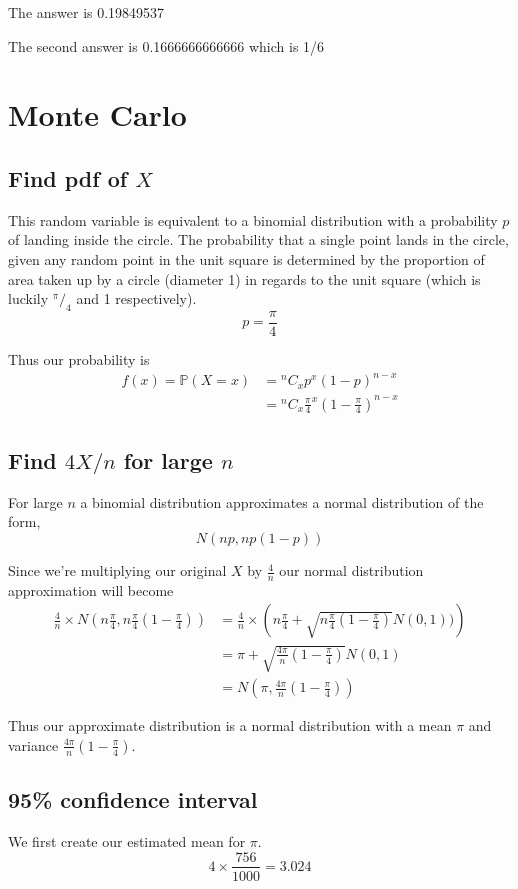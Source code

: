\documentclass{article}
\newcommand{\prob}{\mathbb{P}}
\begin{document}
The answer is 0.19849537

The second answer is 0.1666666666666 which is 1/6

\section{Monte Carlo}
\subsection{Find pdf of $X$}
This random variable is equivalent to a binomial distribution with a
probability $p$ of landing inside the circle. The probability that a single
point lands in the circle, given any random point in the unit square is
determined by the proportion of area taken up by a circle (diameter 1)
in regards to the unit square
(which is luckily ${}^\pi/_4$ and 1 respectively).
\[
    p = \frac{\pi}{4}
\]

Thus our probability is
\begin{align*}
    f(x) = \prob(X=x) &= {}^nC_x p^x (1-p)^{n-x} \\
    &= {}^nC_x \frac{\pi}{4}^x (1-\frac{\pi}{4})^{n-x}
\end{align*}

\subsection{Find $4X/n$ for large $n$}
For large $n$ a binomial distribution approximates a normal distribution
of the form,
\[
    N(np, np(1-p))
\]

Since we're multiplying our original $X$ by $\frac{4}{n}$ our
normal distribution approximation will become
\begin{align*}
    \frac{4}{n} \times N\left(n\frac{\pi}{4}, n\frac{\pi}{4}
        \left(1-\frac{\pi}{4}\right)\right)
    &= \frac{4}{n} \times \left(n\frac{\pi}{4}
        + \sqrt{n\frac{\pi}{4}\left(1-\frac{\pi}{4}\right)} N(0, 1))\right) \\
    &= \pi + \sqrt{\frac{4\pi}{n}\left(1-\frac{\pi}{4}\right)} N(0, 1) \\
    &= N(\pi, \frac{4\pi}{n}\left(1-\frac{\pi}{4}\right))
\end{align*}

Thus our approximate distribution is a normal distribution with
a mean $\pi$ and variance $\frac{4\pi}{n}\left(1-\frac{\pi}{4}\right)$.

\subsection{95\% confidence interval}
We first create our estimated mean for $\pi$.
\[
    4 \times \frac{756}{1000} = 3.024
\]
\end{document}
